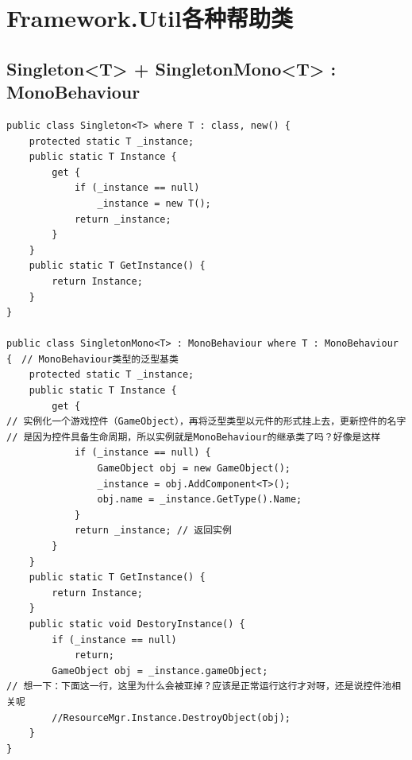 \documentclass[9pt, b5paper]{article}
\begin{document}
\section{Framework.Util各种帮助类}
\label{sec-9}
\subsection{}
\label{sec-9-1}
\subsection{}
\label{sec-9-2}

\subsection{}
\label{sec-9-3}
\subsection{}
\label{sec-9-4}
\subsection{Singleton<T> + SingletonMono<T> : MonoBehaviour}
\label{sec-9-5}
\begin{verbatim}
public class Singleton<T> where T : class, new() {
    protected static T _instance;
    public static T Instance {
        get {
            if (_instance == null) 
                _instance = new T();
            return _instance;
        }
    }
    public static T GetInstance() {
        return Instance;
    }
}

public class SingletonMono<T> : MonoBehaviour where T : MonoBehaviour {　// MonoBehaviour类型的泛型基类
    protected static T _instance;
    public static T Instance {
        get {
// 实例化一个游戏控件（GameObject），再将泛型类型以元件的形式挂上去，更新控件的名字
// 是因为控件具备生命周期，所以实例就是MonoBehaviour的继承类了吗？好像是这样
            if (_instance == null) {　
                GameObject obj = new GameObject();
                _instance = obj.AddComponent<T>();
                obj.name = _instance.GetType().Name;
            }
            return _instance; // 返回实例
        }
    }
    public static T GetInstance() {
        return Instance;
    }
    public static void DestoryInstance() {
        if (_instance == null)
            return;
        GameObject obj = _instance.gameObject;
// 想一下：下面这一行，这里为什么会被亚掉？应该是正常运行这行才对呀，还是说控件池相关呢
        //ResourceMgr.Instance.DestroyObject(obj);　
    }
}
\end{verbatim}
\end{document}

